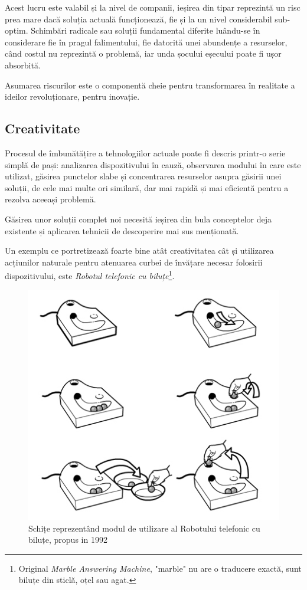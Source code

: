 Acest lucru este valabil și la nivel de companii, ieșirea din tipar reprezintă un risc prea mare dacă soluția actuală funcționează, fie și la un nivel considerabil sub-optim. Schimbări radicale sau soluții fundamental diferite luându-se în considerare fie în pragul falimentului, fie datorită unei abundențe a resurselor, când costul nu reprezintă o problemă, iar unda șocului eșecului poate fi ușor absorbită.

Asumarea riscurilor este o componentă cheie pentru transformarea în realitate a ideilor revoluționare, pentru inovație.

\subsection{Creativitate}

Procesul de îmbunătățire a tehnologiilor actuale poate fi descris printr-o serie simplă de pași: analizarea dispozitivului în cauză, observarea modului în care este utilizat, găsirea punctelor slabe și concentrarea resurselor asupra găsirii unei soluții, de cele mai multe ori similară, dar mai rapidă și mai eficientă pentru a rezolva aceeași problemă.

Găsirea unor soluții complet noi necesită ieșirea din bula conceptelor deja existente și aplicarea tehnicii de descoperire mai sus menționată.

Un exemplu ce portretizează foarte bine atât creativitatea cât și utilizarea acțiunilor naturale pentru atenuarea curbei de învățare necesar folosirii dispozitivului, este \textit{Robotul telefonic cu biluțe}\footnote{Original \textit{Marble Answering Machine}, "marble" nu are o traducere exactă, sunt biluțe din sticlă, oțel sau agat.}.

\begin{figure}[h]
  \centering
  \includegraphics[scale=0.6]{img/marbleAnswMachine.png}
  \caption{Schițe reprezentând modul de utilizare al Robotului telefonic cu biluțe, propus in 1992}
\end{figure}

